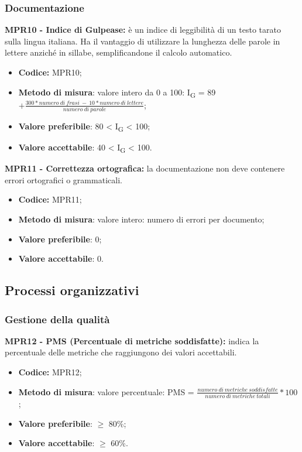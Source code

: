 \subsubsection{Documentazione}
\textbf{MPR10 - Indice di Gulpease:} è un indice di leggibilità di un testo tarato sulla lingua italiana.
Ha il vantaggio di utilizzare la lunghezza delle parole in lettere anziché in sillabe, semplificandone il calcolo automatico.
\begin{itemize}
    \item \textbf{Codice:} MPR10;
    \item \textbf{Metodo di misura}: valore intero da 0 a 100: I\textsubscript{G} = 89 $+ \frac{300*numero \ di \ frasi \ - \ 10*numero \ di \ lettere}{numero \ di \ parole}$;
    \item \textbf{Valore preferibile}: 80 < I\textsubscript{G} < 100;
    \item \textbf{Valore accettabile}: 40 < I\textsubscript{G} < 100.
\end{itemize}
\textbf{MPR11 - Correttezza ortografica:} la documentazione non deve contenere errori ortografici o grammaticali.
\begin{itemize}
    \item \textbf{Codice:} MPR11;
    \item \textbf{Metodo di misura}: valore intero: numero di errori per documento;
    \item \textbf{Valore preferibile}: 0;
    \item \textbf{Valore accettabile}: 0.
\end{itemize}
\subsection{Processi organizzativi}
\subsubsection{Gestione della qualità}
\textbf{MPR12 - PMS (Percentuale di metriche soddisfatte):} indica la percentuale delle metriche che raggiungono dei valori accettabili.
\begin{itemize}
    \item \textbf{Codice:} MPR12;
    \item \textbf{Metodo di misura}: valore percentuale: PMS = $\frac{numero \ di \ metriche \ soddisfatte}{numero \ di \ metriche \ totali} * 100$ ;
    \item \textbf{Valore preferibile}: $\geq$ 80\%;
    \item \textbf{Valore accettabile}: $\geq$ 60\%.
\end{itemize}
\newpage
